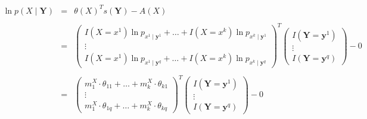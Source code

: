 \documentclass[11pt, oneside]{article}   	%
\numberwithin{figure}{section}
\numberwithin{equation}{section}
\numberwithin{table}{section}
\theoremstyle{definition}
\begin{document}
\begin{appendices}
\begin{itemize}
\begin{eqnarray*}
\ln p(X\mid \mathbf{Y}) &=& \theta(X)^T s(\mathbf{Y}) - A(X) \\ \\
&=&
\begin{pmatrix}
I(X=x^1)  \ln p_{x^1\mid \mathbf{y}^1}  + \ldots + I(X=x^k)  \ln p_{x^k\mid \mathbf{y}^1} \\
\vdots \\
I(X=x^1)  \ln p_{x^1\mid \mathbf{y}^q}  + \ldots + I(X=x^k)  \ln p_{x^k\mid \mathbf{y}^q}
\end{pmatrix}^T
\begin{pmatrix}
I(\mathbf{Y}=\mathbf{y}^1) \\
\vdots \\
I(\mathbf{Y}=\mathbf{y}^q)
\end{pmatrix}
- 0\\ \\
&=&
\begin{pmatrix}
m^X_1 \cdot \theta_{11}  +  \ldots + m^X_k \cdot \theta_{k1}\\
\vdots \\
m^X_1 \cdot \theta_{1q}   + \ldots + m^X_k \cdot \theta_{kq}
\end{pmatrix}^T
\begin{pmatrix}
I(\mathbf{Y}=\mathbf{y}^1) \\
\vdots \\
I(\mathbf{Y}=\mathbf{y}^q)
\end{pmatrix}
- 0
\end{eqnarray*}



\end{itemize}
\end{appendices}
\end{document}
